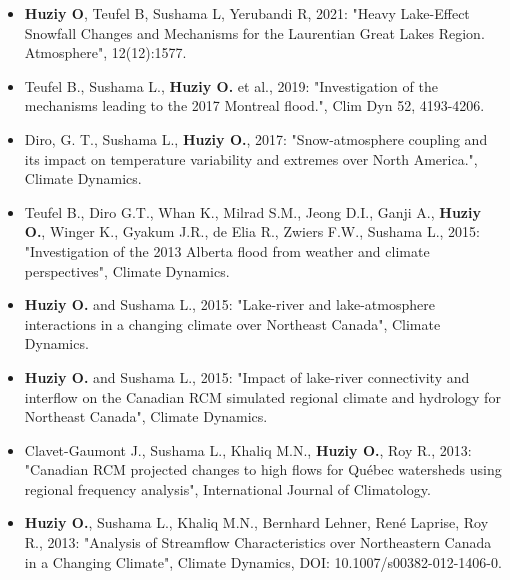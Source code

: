 \vspace{\vertspace}


{
\renewcommand{\labelitemi}{}
\begin{itemize}

    \item \textbf{Huziy O}, Teufel B, Sushama L, Yerubandi R, 2021: "Heavy Lake-Effect Snowfall Changes and Mechanisms 
    for the Laurentian Great Lakes Region. Atmosphere", 12(12):1577.

    \item Teufel B., Sushama L., \textbf{Huziy O.} et al., 2019: "Investigation of the mechanisms leading to the 2017 Montreal flood.",
    Clim Dyn 52, 4193-4206. 

    \item Diro, G. T., Sushama L., \textbf{Huziy O.}, 2017: "Snow-atmosphere coupling and its impact
    on temperature variability and extremes over North America.", Climate Dynamics.

    \item Teufel B., Diro G.T., Whan K., Milrad S.M., Jeong D.I., Ganji A.,
    \textbf{Huziy O.}, Winger K., Gyakum J.R., de Elia R., Zwiers F.W., Sushama
    L., 2015: "Investigation of the 2013 Alberta flood from weather and climate
    perspectives", Climate Dynamics.

    \item \textbf{Huziy O.} and Sushama L., 2015: "Lake-river and
    lake-atmosphere interactions in a changing climate over Northeast Canada",
    Climate Dynamics.

    \item \textbf{Huziy O.} and Sushama L., 2015: "Impact of lake-river
    connectivity and interflow on the Canadian RCM simulated regional climate
    and hydrology for Northeast Canada", Climate Dynamics.

    \item Clavet-Gaumont J., Sushama L., Khaliq M.N.,
    \textbf{Huziy O.}, Roy R., 2013: "Canadian RCM projected changes to high
    flows for Québec watersheds using regional frequency analysis", International Journal of Climatology.

    \item \textbf{Huziy O.}, Sushama L., Khaliq M.N., Bernhard
    Lehner, René Laprise, Roy R., 2013: "Analysis of Streamflow Characteristics over Northeastern Canada
     in a Changing Climate", Climate Dynamics, DOI:
     10.1007/s00382-012-1406-0.

\end{itemize}
}
